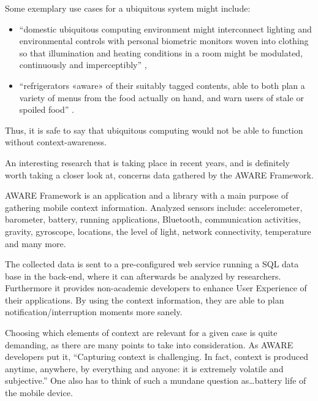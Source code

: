 Some exemplary use cases for a ubiquitous system might include:

\begin{itemize}
	\item ``domestic ubiquitous computing environment might interconnect lighting and environmental controls with personal biometric monitors woven into clothing so that illumination and heating conditions in a room might be modulated, continuously and imperceptibly'' \cite{wiki:ubiquitous},
	\item ``refrigerators «aware» of their suitably tagged contents, able to both plan a variety of menus from the food actually on hand, and warn users of stale or spoiled food'' \cite{wiki:ubiquitous}.
\end{itemize}

Thus, it is safe to say that ubiquitous computing would not be able to function without context-awareness.

An interesting research that is taking place in recent years, and is definitely worth taking a closer look at, concerns data gathered by the AWARE Framework.

AWARE Framework is an application and a library with a main purpose of gathering mobile context information. Analyzed sensors include: accelerometer, barometer, battery, running applications, Bluetooth, communication activities, gravity, gyroscope, locations, the level of light, network connectivity, temperature and many more. \cite{aware}

The collected data is sent to a pre-configured web service running a SQL data base in the back-end, where it can afterwards be analyzed by researchers. Furthermore it provides non-academic developers to enhance User Experience of their applications. By using the context information, they are able to plan notification/interruption moments more sanely. \cite{aware}

Choosing which elements of context are relevant for a given case is quite demanding, as there are many points to take into consideration. As AWARE developers put it, ``Capturing context is challenging. In fact, context is produced anytime, anywhere, by everything and anyone: it is extremely volatile and subjective.'' \cite{aware} One also has to think of such a mundane question as\ldots battery life of the mobile device.

\vspace{4cm}

\clearpage

